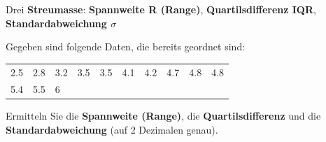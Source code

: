  Drei \textbf{Streumasse}: \textbf{Spannweite R (Range)},
  \textbf{Quartilsdifferenz IQR}, \textbf{Standardabweichung $\sigma$}

  Gegeben sind folgende Daten, die bereits geordnet sind:

  \begin{tabular}{llllllllll}
    2.5 & 2.8 & 3.2 & 3.5 & 3.5 & 4.1 & 4.2 & 4.7 & 4.8 & 4.8\\
    5.4 & 5.5 & 6
  \end{tabular}

  Ermitteln Sie die \textbf{Spannweite (Range)}, die
  \textbf{Quartilsdifferenz} und die \textbf{Standardabweichung} (auf
  2 Dezimalen genau).
  
  

\newpage
